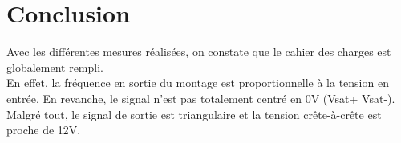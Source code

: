 \chapter{Conclusion}

Avec les différentes mesures réalisées, on constate que le cahier des charges est globalement rempli.\\
En effet, la fréquence en sortie du montage est proportionnelle à la tension en entrée. En revanche, le signal n’est pas totalement centré en 0V (Vsat+ Vsat-). \\
Malgré tout, le signal de sortie est triangulaire et la tension crête-à-crête est proche de 12V.\\
